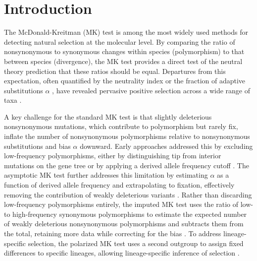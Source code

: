 \section{Introduction}

The McDonald-Kreitman (MK) test \citep{mcdonald1991}
is among the most widely used methods for detecting natural selection
at the molecular level.
By comparing the ratio of nonsynonymous to synonymous changes
within species (polymorphism) to that between species (divergence),
the MK test provides a direct test of the neutral theory prediction
that these ratios should be equal. Departures from this expectation,
often quantified by the neutrality index \citep[NI;][]{rand1996}
or the fraction of adaptive substitutions $\alpha$ \citep{smith2002},
have revealed pervasive positive selection across a wide range of taxa
\citep[e.g.,][]{lozada-chavez2025, brown2024, liti2009, lam2010,
downing2009, hughes2008, li2008}.

A key challenge for the standard MK test is that
slightly deleterious nonsynonymous mutations,
which contribute to polymorphism but rarely fix,
inflate the number of nonsynonymous polymorphisms relative to
nonsynonymous substitutions and bias $\alpha$ downward.
Early approaches addressed this by excluding low-frequency
polymorphisms, either by distinguishing tip from interior
mutations on the gene tree \citep{templeton1996}
or by applying a derived allele frequency cutoff \citep{fay2001}.
The asymptotic MK test further addresses this limitation
by estimating $\alpha$ as a function of derived allele frequency
and extrapolating to fixation,
effectively removing the contribution of weakly deleterious variants
\citep{messer2013, haller2017}.
Rather than discarding low-frequency polymorphisms entirely,
the imputed MK test uses the ratio of low- to high-frequency
synonymous polymorphisms to estimate the expected number
of weakly deleterious nonsynonymous polymorphisms
and subtracts them from the total,
retaining more data while correcting for the bias
\citep{murga-moreno2022}.
To address lineage-specific selection, the polarized MK test
uses a second outgroup
to assign fixed differences to specific lineages,
allowing lineage-specific inference of selection \citep{begun2007}.

